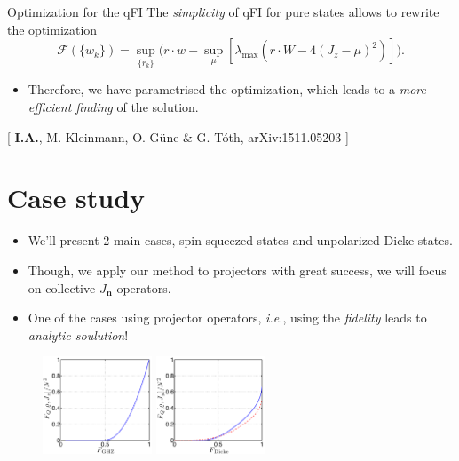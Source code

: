 \documentclass{beamer}
\newcommand{\citate}[1]{{\footnotesize{\color{gray}[ #1 ]}}

	}
\begin{document}
		\begin{frame}
			\begin{block}
				{Optimization for the qFI}
				The \emph{\color{blue} simplicity} of qFI for pure states allows to rewrite the optimization
				{\small
				\[
				\mathcal{F}(\{w_k\}) = \sup_{\{r_k\}} \big( r\cdot w - \sup_{\mu} [ \lambda_{\max} ( r\cdot W - 4(J_z-\mu)^2 ) ] \big).
				\]}
			\end{block}
			\begin{itemize}
				\item Therefore, we have parametrised the optimization, which leads to a \emph{more efficient finding} of the solution.

			\end{itemize}

			\citate{{\bf I.A.}, M. Kleinmann, O. G\"une \& G. T\'oth, arXiv:1511.05203}

		\end{frame}

\section{Case study}

		\begin{frame}
			\tableofcontents[currentsection]

		\end{frame}

		\begin{frame}
			\begin{itemize}
				\item We'll present 2 main cases, spin-squeezed states and unpolarized Dicke states.
				\item Though, we apply our method to projectors with great success, we will focus on collective $J_{\mathbf n}$ operators.
				\item One of the cases using projector operators, {\it i.e.}, using the \emph{fidelity} leads to \emph{\color{blue}analytic soulution}!
			\end{itemize}
			\begin{figure}
				\includegraphics[height=110px]{img/lb-ghzfidelity.pdf}
				\hspace{10px}
				\includegraphics[height=110px]{img/lb-dickefidelity}
			\end{figure}

		\end{frame}
\end{document}
